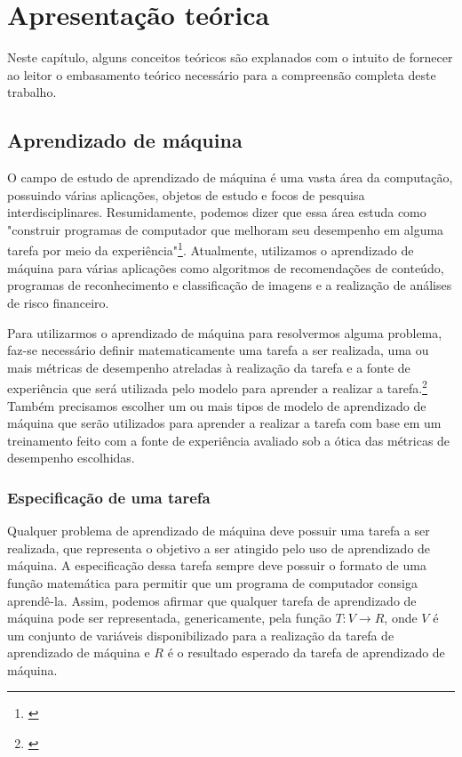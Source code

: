 \chapter{Apresentação teórica} \label{chap:apresentacao_teorica}

Neste capítulo, alguns conceitos teóricos são explanados com o intuito de fornecer ao leitor o embasamento teórico necessário para a compreensão completa deste trabalho.

\section{Aprendizado de máquina}

O campo de estudo de aprendizado de máquina é uma vasta área da computação, possuindo várias aplicações, objetos de estudo e focos de pesquisa interdisciplinares. Resumidamente, podemos dizer que essa área estuda como "construir programas de computador que melhoram seu desempenho em alguma tarefa por meio da experiência"\footnote{\cite[p.29]{machine_learning}}. Atualmente, utilizamos o aprendizado de máquina para várias aplicações como algoritmos de recomendações de conteúdo, programas de reconhecimento e classificação de imagens e a realização de análises de risco financeiro.

Para utilizarmos o aprendizado de máquina para resolvermos alguma problema, faz-se necessário definir matematicamente uma tarefa a ser realizada, uma ou mais métricas de desempenho atreladas à realização da tarefa e a fonte de experiência que será utilizada pelo modelo para aprender a realizar a tarefa.\footnote{\cite[p.29]{machine_learning}} Também precisamos escolher um ou mais tipos de modelo de aprendizado de máquina que serão utilizados para aprender a realizar a tarefa com base em um treinamento feito com a fonte de experiência avaliado sob a ótica das métricas de desempenho escolhidas.

\subsection{Especificação de uma tarefa}

Qualquer problema de aprendizado de máquina deve possuir uma tarefa a ser realizada, que representa o objetivo a ser atingido pelo uso de aprendizado de máquina. A especificação dessa tarefa sempre deve possuir o formato de uma função matemática para permitir que um programa de computador consiga aprendê-la. Assim, podemos afirmar que qualquer tarefa de aprendizado de máquina pode ser representada, genericamente, pela função $T : V \rightarrow R$, onde $V$ é um conjunto de variáveis disponibilizado para a realização da tarefa de aprendizado de máquina e $R$ é o resultado esperado da tarefa de aprendizado de máquina.

